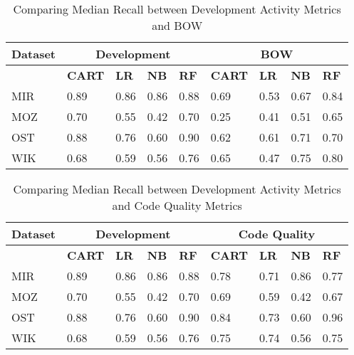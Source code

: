 \documentclass[smallextended]{svjour3}       %
\begin{document}


\begin{table*}[]
\centering
\caption{Comparing Median Recall between Development Activity Metrics and BOW}
\label{res:rq1:table:rec:bow}
\footnotesize{  
\begin{tabular}{p{1.2cm} p{0.9cm} p{0.9cm} p{0.9cm} p{0.9cm} p{0.9cm} p{0.6cm} p{0.6cm} p{0.6cm}  }
\hline
\textbf{Dataset} & \multicolumn{4}{c}{\textbf{Development}} & \multicolumn{4}{c}{\textbf{BOW}} \\
\hline
 &  \textbf{CART} & \textbf{LR} & \textbf{NB} & \textbf{RF} & \textbf{CART} & \textbf{LR} & \textbf{NB} & \textbf{RF} \\
\hline
MIR & \cellcolor{lightgray} 0.89 & 0.86 & 0.86 & 0.88                       & 0.69 & 0.53 & 0.67 & 0.84   \\
MOZ & \cellcolor{lightgray} 0.70 & 0.55 & 0.42 & \cellcolor{lightgray} 0.70 & 0.25 & 0.41 & 0.51 & 0.65   \\
OST & 0.88 & 0.76 & 0.60 & \cellcolor{lightgray} 0.90                       & 0.62 & 0.61 & 0.71 & 0.70    \\
WIK & 0.68 & 0.59 & 0.56 & 0.76                                             & 0.65 & 0.47 & 0.75 & \cellcolor{lightgray} 0.80   \\
\hline
\end{tabular}
}
\end{table*}  

\begin{table*}[]
\centering
\caption{Comparing Median Recall between Development Activity Metrics and Code Quality Metrics}
\label{res:rq1:table:rec:code}
\footnotesize{  
\begin{tabular}{p{1.2cm} p{0.9cm} p{0.9cm} p{0.9cm} p{0.9cm} p{0.9cm} p{0.6cm} p{0.6cm} p{0.6cm}  }
\hline
\textbf{Dataset} & \multicolumn{4}{c}{\textbf{Development}} & \multicolumn{4}{c}{\textbf{Code Quality}} \\
\hline
 &  \textbf{CART} & \textbf{LR} & \textbf{NB} & \textbf{RF} & \textbf{CART} & \textbf{LR} & \textbf{NB} & \textbf{RF} \\
\hline
MIR & \cellcolor{lightgray} 0.89 & 0.86 & 0.86 & 0.88                       & 0.78 & 0.71 & 0.86 & 0.77   \\
MOZ & \cellcolor{lightgray} 0.70 & 0.55 & 0.42 & \cellcolor{lightgray} 0.70 & 0.69 & 0.59 & 0.42 & 0.67   \\
OST & 0.88                       & 0.76 & 0.60 & 0.90                       & 0.84 & 0.73 & 0.60 & \cellcolor{lightgray} 0.96   \\
WIK & 0.68                       & 0.59 & 0.56 & \cellcolor{lightgray}0.76  & 0.75 & 0.74 & 0.56 & 0.75   \\
\hline
\end{tabular}
}
\end{table*}  
\end{document}
